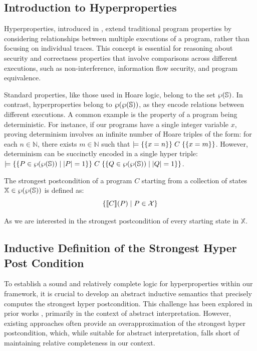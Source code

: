 \documentclass[
  10pt,       %
  twoside,    %
  a4paper,    %
  english,    %
  tikz,       %
  openright,  %
]{book}
\begin{document}
\renewcommand{\chi}{\mathbb{X}}

\subsection{Introduction to Hyperproperties} \label{chp:hyper}

Hyperproperties, introduced in \cite{Clarkson08}, extend traditional program
properties by considering relationships between multiple executions of a
program, rather than focusing on individual traces. This concept is essential
for reasoning about security and correctness properties that involve
comparisons across different executions, such as non-interference, information
flow security, and program equivalence.

Standard properties, like those used in Hoare logic, belong to the set
$\wp(\mathbb{S})$. In contrast, hyperproperties belong to $\wp(\wp(\mathbb{S}))$,
as they encode relations between different executions. A common example is the
property of a program being deterministic. For instance, if our programs have a
single integer variable \(x\), proving determinism involves an infinite number
of Hoare triples of the form: for each \(n \in \mathbb{N}\), there exists \(m
\in \mathbb{N}\) such that $\models \{ \{ x = n \} \} \; C \; \{ \{ x = m \} \}$.
However, determinism can be succinctly encoded in a single hyper triple:
$\models \{ \{ P \in \wp(\wp(\mathbb{S})) \mid |P| = 1 \} \} \; C \; \{ \{ Q \in
\wp(\wp(\mathbb{S})) \mid |Q| = 1 \} \}$.

\begin{definition} 
  The strongest postcondition of a program \(C\) starting from a collection of 
  states \(\chi \in \pow{\pow{\states}}\) is defined as: $$\{ \llbracket C \rrbracket(P) \mid P 
  \in \mathcal{X} \}$$
\end{definition}

As we are interested in the strongest postcondition of every starting state in
$\chi$.

\subsection{Inductive Definition of the Strongest Hyper Post Condition}

To establish a sound and relatively complete logic for hyperproperties within
our framework, it is crucial to develop an abstract inductive semantics that
precisely computes the strongest hyper postcondition. This challenge has been
explored in prior works \cite{Mounir17, Mastroeni18}, primarily in the context
of abstract interpretation. However, existing approaches often provide an
overapproximation of the strongest hyper postcondition, which, while suitable
for abstract interpretation, falls short of maintaining relative completeness
in our context.
\end{document}
